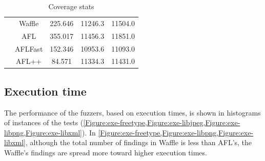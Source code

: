 \begin{table}[!t]
\begin{tabular}{|c|c|c|c|c|}
        \hline
        \rowcolor{lightgray} \multirow[t]{4}{*}{\cellcolor{white}libxml}  
        & Waffle    & 225.646 & 11246.3 & 11504.0 \\ \cline{2-5}
        & AFL    & 355.017 & 11456.3 & 11851.0 \\ \cline{2-5}
        \rowcolor{lightgray} \cellcolor{white} & AFLFast    & 152.346 & 10953.6 & 11093.0 \\ \cline{2-5}
        & AFL++    & 84.571  & 11334.3 & 11431.0 \\ \cline{2-5}
        \hline
    \end{tabular}
    \caption{Coverage stats}
    \label{table:all-cov}
\end{table}

\subsection{Execution time}

The performance of the fuzzers, based on execution times, is shown in histograms of instances of the tests (\cref{Figure:exe-freetype,Figure:exe-libjpeg,Figure:exe-libpng,Figure:exe-libxml}). In \cref{Figure:exe-freetype,Figure:exe-libpng,Figure:exe-libxml}, although the total number of findings in Waffle is less than AFL's, the Waffle's findings are spread more toward higher execution times.

